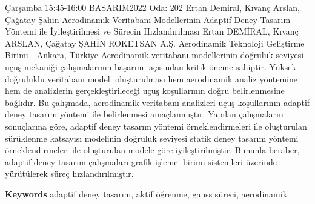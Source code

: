 
    \begin{abstract_basarim}
    {Çarşamba 15:45-16:00}
    {BASARIM2022}
    {Oda: 202}
    {Ertan Demiral, Kıvanç Arslan, Çağatay Şahin}
    {Aerodinamik Veritabanı Modellerinin Adaptif Deney Tasarım Yöntemi ile İyileştirilmesi ve Sürecin Hızlandırılması}
    {%
    Ertan DEMİRAL, Kıvanç ARSLAN, Çağatay ŞAHİN}
    {%
    }
    {%
    ROKETSAN A.Ş. Aerodinamik Teknoloji Geliştirme Birimi - Ankara, Türkiye}
    Aerodinamik veritabanı modellerinin doğruluk seviyesi uçuş mekaniği çalışmalarının başarımı açısından kritik öneme sahiptir. Yüksek doğruluklu veritabanı modeli oluşturulması hem aerodinamik analiz yöntemine hem de analizlerin gerçekleştirileceği uçuş koşullarının doğru belirlenmesine bağlıdır. Bu çalışmada, aerodinamik veritabanı analizleri uçuş koşullarının adaptif deney tasarım yöntemi ile belirlenmesi amaçlanmıştır. Yapılan çalışmaların sonuçlarına göre, adaptif deney tasarım yöntemi örneklendirmeleri ile oluşturulan sürüklenme katsayısı modelinin doğruluk seviyesi statik deney tasarım yöntemi örneklendirmeleri ile oluşturulan modele göre iyileştirilmiştir. Bununla beraber, adaptif deney tasarım çalışmaları grafik işlemci birimi sistemleri üzerinde yürütülerek süreç hızlandırılmıştır. 
    
        \textbf{Keywords} \newline{}adaptif deney tasarım, aktif öğrenme, gauss süreci, aerodinamik
    \end{abstract_basarim}
    